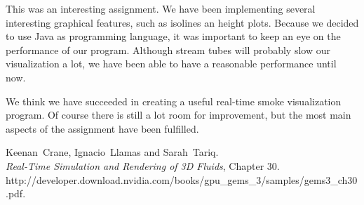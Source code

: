 \documentclass[a4paper,11pt,twoside]{report}
\begin{document}
    This was an interesting assignment. We have been implementing several interesting graphical features, such as isolines an height plots. Because we decided to use Java as programming language, it was important to keep an eye on the performance of our program. Although stream tubes will probably slow our visualization a lot, we have been able to have a reasonable performance until now.
    
    We think we have succeeded in creating a useful real-time smoke visualization program. Of course there is still a lot room for improvement, but the most main aspects of the assignment have been fulfilled.
    

\begin{thebibliography}{99}
 Keenan~Crane, Ignacio~Llamas and Sarah~Tariq.\\
        \textit{Real-Time Simulation and Rendering of 3D Fluids}, Chapter 30.\\
        http://developer.download.nvidia.com/books/gpu\_gems\_3/samples/gems3\_ch30.pdf.\\
\end{thebibliography}
\end{document}
